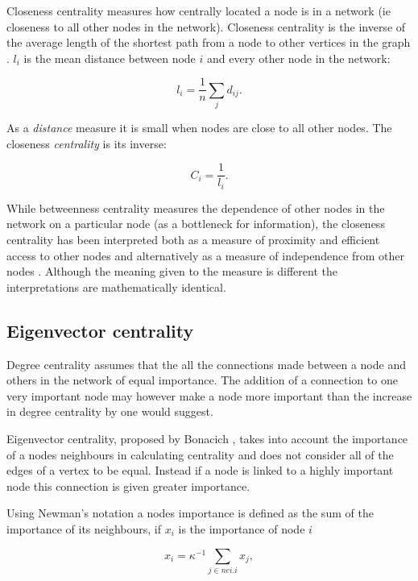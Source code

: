 Closeness centrality measures how centrally located a node is in a network (ie closeness to all other nodes in the network). Closeness centrality is the inverse of the average length of the shortest path from a node to other vertices in the graph \cite{freeman1978centrality}. $l_i$ is the mean distance between node $i$ and every other node in the network:

\begin{equation}
    l_i = \frac{1}{n} \sum_j d_{ij}.
\end{equation}

 As a \textit{distance} measure it is small when nodes are close to all other nodes. The closeness \textit{centrality} is its inverse:


\begin{equation}
    C_i = \frac{1}{l_i}.
\end{equation}
\cite{newman2018networks}

While betweenness centrality measures the dependence of other nodes in the network on a particular node (as a bottleneck for information), the closeness centrality has been interpreted both as a measure of proximity and efficient access to other nodes and alternatively as a measure of independence from other nodes \cite{brandes2016maintaining}. Although the meaning given to the measure is different the interpretations are mathematically identical.



\subsection{Eigenvector centrality}
Degree centrality assumes that the all the connections made between a node and others in the network  of equal importance.  The addition of a connection to one very important node may however make a node more important than the increase in degree centrality by one would suggest. 

Eigenvector centrality, proposed by Bonacich \cite{bonacich1972factoring}, takes into account the importance of a nodes neighbours in calculating centrality and does not consider all of the edges of a vertex to be equal. Instead if a node is linked to a highly important node this connection is given greater importance. 

Using Newman's notation \cite{newman2018networks} a nodes importance is defined as the sum of the importance of its neighbours, if $x_i$ is the importance of node $i$

\begin{equation}
    x_i = \kappa^{-1} \sum_{j\in nei. i} x_j,
\end{equation}

